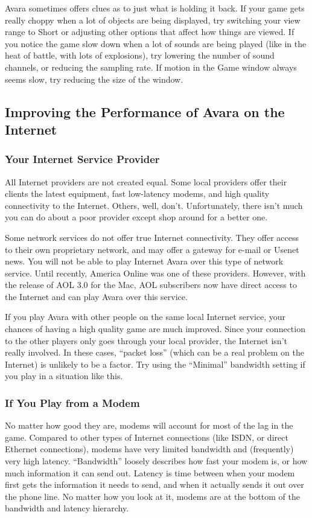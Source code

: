 \documentclass{article}
\begin{document}
Avara sometimes offers clues as to just what is holding it back. If your game gets really choppy when a lot of objects are being displayed, try switching your view range to Short or adjusting other options that affect how things are viewed. If you notice the game slow down when a lot of sounds are being played (like in the heat of battle, with lots of explosions), try lowering the number of sound channels, or reducing the sampling rate. If motion in the Game window always seems slow, try reducing the size of the window.

\subsection{Improving the Performance of Avara on the Internet}
\subsubsection{Your Internet Service Provider}
All Internet providers are not created equal. Some local providers offer their clients the latest equipment, fast low-latency modems, and high quality connectivity to the Internet. Others, well, don't. Unfortunately, there isn't much you can do about a poor provider except shop around for a better one.

Some network services do not offer true Internet connectivity. They offer access to their own proprietary network, and may offer a gateway for e-mail or Usenet news. You will not be able to play Internet Avara over this type of network service. Until recently, America Online was one of these providers. However, with the release of AOL 3.0 for the Mac, AOL subscribers now have direct access to the Internet and can play Avara over this service.

If you play Avara with other people on the same local Internet service, your chances of having a high quality game are much improved. Since your connection to the other players only goes through your local provider, the Internet isn't really involved. In these cases, ``packet loss'' (which can be a real problem on the Internet) is unlikely to be a factor. Try using the ``Minimal'' bandwidth setting if you play in a situation like this.

\subsubsection{If You Play from a Modem}
No matter how good they are, modems will account for most of the lag in the game. Compared to other types of Internet connections (like ISDN, or direct Ethernet connections), modems have very limited bandwidth and (frequently) very high latency. ``Bandwidth'' loosely describes how fast your modem is, or how much information it can send out. Latency is time between when your modem first gets the information it needs to send, and when it actually sends it out over the phone line. No matter how you look at it, modems are at the bottom of the bandwidth and latency hierarchy.
\end{document}
